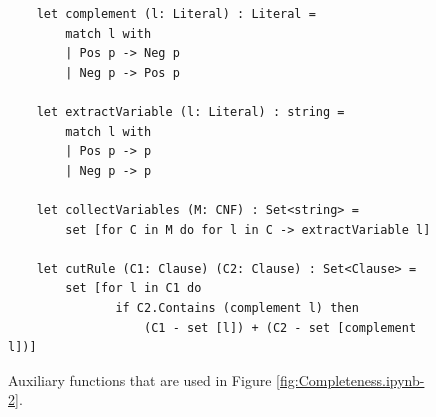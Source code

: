 \begin{figure}[!ht]
\centering
\begin{verbatim}
    let complement (l: Literal) : Literal =
        match l with
        | Pos p -> Neg p
        | Neg p -> Pos p

    let extractVariable (l: Literal) : string =
        match l with
        | Pos p -> p
        | Neg p -> p

    let collectVariables (M: CNF) : Set<string> =
        set [for C in M do for l in C -> extractVariable l]

    let cutRule (C1: Clause) (C2: Clause) : Set<Clause> =
        set [for l in C1 do
               if C2.Contains (complement l) then
                   (C1 - set [l]) + (C2 - set [complement l])]
\end{verbatim}
\vspace*{-0.3cm}
\caption{Auxiliary functions that are used in Figure \ref{fig:Completeness.ipynb-2}.}
\label{fig:Completeness.ipynb-1}
\end{figure}

